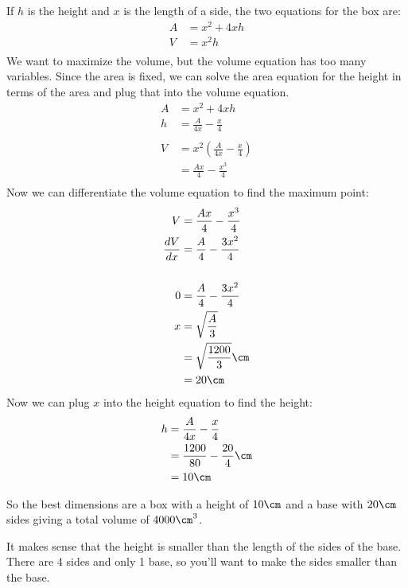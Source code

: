\documentclass[fleqn,addpoints]{exam}
\begin{document}
\begin{questions}
\begin{solution}
If $h$ is the height and $x$ is the length of a side, the two equations for the box are:
\begin{align*}
  A &= x^2 + 4xh \\
  V &= x^2h \\
\end{align*}
We want to maximize the volume, but the volume equation has too many variables.  Since the area is fixed, we can solve the area equation
for the height in terms of the area and plug that into the volume equation.
\begin{align*}
  A &= x^2 + 4xh \\
  h &= \frac{A}{4x} - \frac{x}{4} \\
\\
  V &= x^2 \left( \frac{A}{4x} - \frac{x}{4} \right) \\
    &= \frac{Ax}{4} - \frac{x^3}{4} \\
\end{align*}
Now we can differentiate the volume equation to find the maximum point:
\begin{align*}
   V &= \frac{Ax}{4} - \frac{x^3}{4} \\
   \frac{dV}{dx} &= \frac{A}{4} - \frac{3x^2}{4} \\
\\
   0 &= \frac{A}{4} - \frac{3x^2}{4} \\
   x &= \sqrt{\frac{A}{3}} \\
     &= \sqrt{\frac{1200}{3}} \cm \\
     &= 20 \cm \\
\end{align*}
Now we can plug $x$ into the height equation to find the height:
\begin{align*}
    h &= \frac{A}{4x} - \frac{x}{4} \\
      &= \frac{1200}{80} - \frac{20}{4} \cm \\
      &= 10 \cm \\
\end{align*}

So the best dimensions are a box with a height of $10 \cm$ and a base with $20 \cm$ sides giving a total volume of 
$4000 \cm^3$.  

It makes sense that the height is smaller than the length of the sides of the base.  There are
4 sides and only 1 base, so you'll want to make the sides smaller than the base.



\end{solution}
\end{questions}
\end{document}

